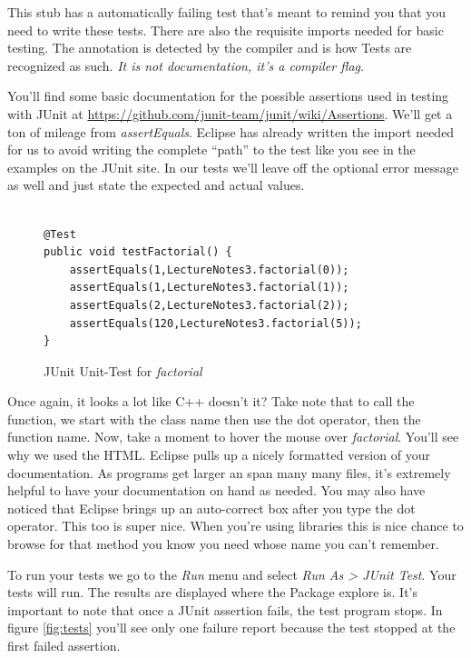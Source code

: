 \documentclass[]{tufte-handout}
\begin{document}
This stub has a automatically failing test that's meant to remind you that you need to write these tests. There are also the requisite imports needed for basic testing. The \@Test annotation is detected by the compiler and is how Tests are recognized as such. \textit{It is not documentation, it's a compiler flag}. 


You'll find some basic documentation for the possible assertions used in testing with JUnit at \url{https://github.com/junit-team/junit/wiki/Assertions}. We'll get a ton of mileage from \textit{assertEquals}. Eclipse has already written the import needed for us to avoid writing the complete ``path'' to the test like you see in the examples on the JUnit site. In our tests we'll leave off the optional error message as well and just state the expected and actual values. 

\begin{figure}
\begin{lstlisting}

@Test
public void testFactorial() {
	assertEquals(1,LectureNotes3.factorial(0));
	assertEquals(1,LectureNotes3.factorial(1));
	assertEquals(2,LectureNotes3.factorial(2));
	assertEquals(120,LectureNotes3.factorial(5));
}

\end{lstlisting}
\label{fig:factTests}
\caption{JUnit Unit-Test for \textit{factorial}}
\end{figure}

Once again, it looks a lot like C++ doesn't it? Take note that to call the function, we start with the class name then use the dot operator, then the function name. Now, take a moment to hover the mouse over \textit{factorial}. You'll see why we used the HTML. Eclipse pulls up a nicely formatted version of your documentation. As programs get larger an span many many files, it's extremely helpful to have your documentation on hand as needed. You may also have noticed that Eclipse brings up an auto-correct box after you type the dot operator. This too is super nice. When you're using libraries this is nice chance to browse for that method you know you need whose name you can't remember. 

To run your tests we go to the \textit{Run} menu and select \textit{Run As > JUnit Test}. Your tests will run. 	The results are displayed where the Package explore is. It's important to note that once a JUnit assertion fails, the test program stops.  In figure \ref{fig:tests} you'll see only one failure report because the test stopped at the first failed assertion.
\end{document}
